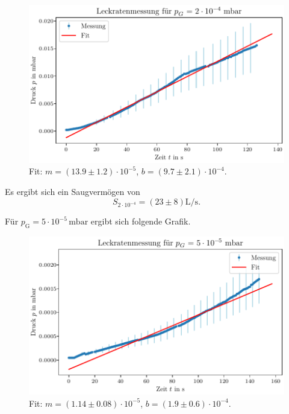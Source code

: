 \begin{figure}[H]
    \centering
    \includegraphics[width=\textwidth]{plots/TP_Leck_2e4.pdf}
    \caption{Fit: $m = (\num{13.9} \pm \num{1.2}) \cdot 10^{-5}$, $b = (\num{9.7} \pm \num{2.1}) \cdot 10^{-4}$.}
    \label{fig:TP_Leck_2e4}
\end{figure}

Es ergibt sich ein Saugvermögen von
\begin{equation}
    S_{2 \cdot 10^{-4}} = (\num{23} \pm \num{8}) \si{\liter\per\second}.
\end{equation}

Für $p_\text{G} = 5 \cdot 10^{-5} \, \si{\milli\bar}$ ergibt sich folgende Grafik.

\begin{figure}[H]
    \centering
    \includegraphics[width=\textwidth]{plots/TP_Leck_5e5.pdf}
    \caption{Fit: $m = (\num{1.14} \pm \num{0.08}) \cdot 10^{-5}$, $b = (\num{1.9} \pm \num{0.6}) \cdot 10^{-4}$.}
    \label{fig:TP_Leck_5e5}
\end{figure}

